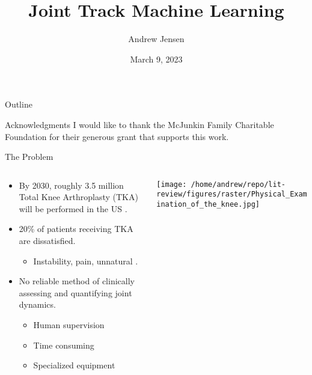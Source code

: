 \documentclass[presentation, aspectratio=1610]{beamer}
\author{Andrew Jensen}
\date{March 9, 2023}
\title{Joint Track Machine Learning}
\begin{document}
\maketitle
\begin{frame}{Outline}
\tableofcontents
\end{frame}


\begin{frame}[label={sec:orgf2c0636},standout]{Acknowledgments}
I would like to thank the McJunkin Family Charitable Foundation for their generous grant that supports this work.
\end{frame}

\begin{frame}[label={sec:org1e1bafb}]{The Problem}
\begin{columns}
\begin{column}{0.5\columnwidth}
\begin{itemize}
\item By 2030, roughly 3.5 million Total Knee Arthroplasty (TKA) will be performed in the US \autocite{kurtzProjectionsPrimaryRevision2007}.
\item 20\% of patients receiving TKA are dissatisfied.
\begin{itemize}
\item Instability, pain, unnatural \autocites{bakerRolePainFunction2007}[][]{bournePatientSatisfactionTotal2010}[][]{scottPredictingDissatisfactionFollowing2010}.
\end{itemize}
\item No reliable method of clinically assessing and quantifying joint dynamics.
\begin{itemize}
\item Human supervision
\item Time consuming
\item Specialized equipment
\end{itemize}
\end{itemize}
\end{column}
\begin{column}{0.5\columnwidth}
\begin{center}
\texttt{[image: /home/andrew/repo/lit-review/figures/raster/Physical\_Examination\_of\_the\_knee.jpg]}
\end{center}
\end{column}
\end{columns}
\end{frame}
\end{document}

